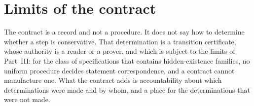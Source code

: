 \section{Limits of the contract}

The contract is a record and not a procedure. It does not say how to determine whether a step is conservative. That determination is a transition certificate, whose authority is a reader or a prover, and which is subject to the limits of Part~III: for the class of specifications that contains hidden-existence families, no uniform procedure decides statement correspondence, and a contract cannot manufacture one. What the contract adds is accountability about which determinations were made and by whom, and a place for the determinations that were not made.

